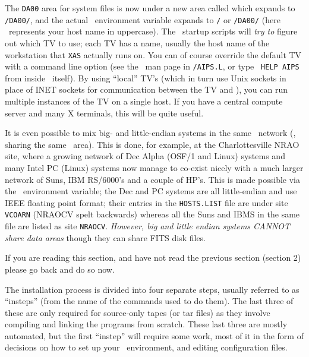 The {\tt DA00} area for system files is now under a new area called
which expands to {\tt \AROOT/DA00/}, and the actual \ environment
variable expands to {\tt {}/\HOST} or {\tt \AROOT/DA00/\HOST} (here
\HOST\ represents your host name in uppercase).  The \AIPS\ startup
scripts will {\it try to} figure out which TV to use; each TV has a
name, usually the host name of the workstation that {\tt XAS} actually
runs on.  You can of course override the default TV with a command line
option (see the \ttaips\ man page in {\tt\SYSU/AIPS.L}, or type {\tt
HELP AIPS} from inside \AIPS\ itself).  By using ``local'' TV's (which
in turn use Unix sockets in place of INET sockets for communication
between the TV and \AIPS), you can run multiple instances of the TV on a
single host.  If you have a central compute server and many X terminals,
this will be quite useful.

It is even possible to mix big- and little-endian systems in the same
\AIPS\ network (\ie, sharing the same \AROOT\ area).  This is done, for
example, at the Charlottesville NRAO site, where a growing network of
Dec Alpha (OSF/1 and Linux) systems and many Intel PC (Linux) systems
now manage to co-exist nicely with a much larger network of Suns, IBM
RS/6000's and a couple of HP's.  This is made possible via the
\SITE\ environment variable; the Dec and PC systems are all
little-endian and use IEEE floating point format; their entries in the
{\tt HOSTS.LIST} file are under site {\tt VCOARN} (NRAOCV spelt
backwards) whereas all the Suns and IBMS in the same file are listed as
site {\tt NRAOCV}.  {\it However, big and little endian systems CANNOT
share data areas\/} though they can share FITS disk files.

If you are reading this section, and have not read the previous section
(section 2) please go back and do so now.
\medskip

\vfill\eject%

The installation process is divided into four separate steps, usually
referred to as ``insteps'' (from the name of the commands used to do
them).  The last three of these are only required for source-only tapes
(or tar files) as they involve compiling and linking the programs from
scratch.  These last three are mostly automated, but the first
``instep'' will require some work, most of it in the form of decisions
on how to set up your \AIPS\ environment, and editing configuration
files.


